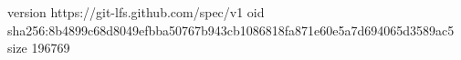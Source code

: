 version https://git-lfs.github.com/spec/v1
oid sha256:8b4899c68d8049efbba50767b943cb1086818fa871e60e5a7d694065d3589ac5
size 196769

